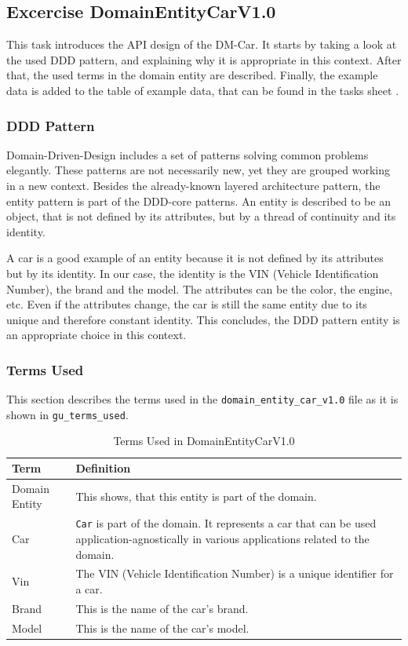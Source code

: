 \subsection{Excercise DomainEntityCarV1.0}
\label{subsec:domain_entity_car_v1.0}
This task introduces the API design of the DM-Car.
It starts by taking a look at the used DDD pattern, and explaining why it is appropriate in this context.
After that, the used terms in the domain entity are described.
Finally, the example data is added to the table of example data, that can be found in the tasks sheet \cite{CM-T-DMC}.

\subsubsection*{DDD Pattern}
\label{subsubsec:ddd_pattern}
Domain-Driven-Design includes a set of patterns solving common problems elegantly.
These patterns are not necessarily new, yet they are grouped working in a new context.
Besides the already-known layered architecture pattern, the entity pattern is part of the DDD-core patterns.
An entity is described to be an object, that is not defined by its attributes, but by a thread of continuity and its identity.

A car is a good example of an entity because it is not defined by its attributes but by its identity.
In our case, the identity is the VIN (Vehicle Identification Number), the brand and the model.
The attributes can be the color, the engine, etc.
Even if the attributes change, the car is still the same entity due to its unique and therefore constant identity.
This concludes, the DDD pattern entity is an appropriate choice in this context.

\subsubsection*{Terms Used}
This section describes the terms used in the \texttt{domain\_entity\_car\_v1.0} file as it is shown in \texttt{gu\_terms\_used}.
\begin{table}[H]
    \centering
    \begin{tabular}{|p{5cm}|p{9cm}|}
        \hline
        \textbf{Term} & \textbf{Definition} \\
        \hline
        Domain Entity & This shows, that this entity is part of the domain. \\
        Car & \texttt{Car} is part of the domain. 
        It represents a car that can be used application-agnostically in various applications related to the domain. \\
        \hline
        Vin & The VIN (Vehicle Identification Number) is a unique identifier for a car.\\
        \hline
        Brand & This is the name of the car's brand.\\
        \hline
        Model & This is the name of the car's model.\\
        \hline
    \end{tabular}
    \caption{Terms Used in DomainEntityCarV1.0}
    \label{tab:terms_used_domain_entity_car_v1.0}
\end{table}

